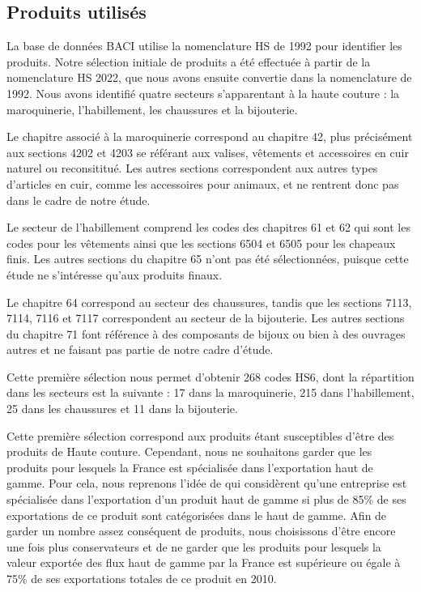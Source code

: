 \documentclass[french,10pt,a4paper]{article}
\begin{document}
\subsection{Produits utilisés}

La base de données BACI utilise la nomenclature HS de 1992 pour identifier les produits. Notre sélection initiale de produits a été effectuée à partir de la nomenclature HS 2022, que nous avons ensuite convertie dans la nomenclature de 1992. Nous avons identifié quatre secteurs s'apparentant à la haute couture : la maroquinerie, l'habillement, les chaussures et la bijouterie.

Le chapitre associé à la maroquinerie correspond au chapitre 42, plus précisément aux sections 4202 et 4203 se référant aux valises, vêtements et accessoires en cuir naturel ou reconsititué. Les autres sections correspondent aux autres types d'articles en cuir, comme les accessoires pour animaux, et ne rentrent donc pas dans le cadre de notre étude.

Le secteur de l'habillement comprend les codes des chapitres 61 et 62 qui sont les codes pour les vêtements ainsi que les sections 6504 et 6505 pour les chapeaux finis. Les autres sections du chapitre 65 n'ont pas été sélectionnées, puisque cette étude ne s'intéresse qu'aux produits finaux. 

Le chapitre 64 correspond au secteur des chaussures, tandis que les sections 7113, 7114, 7116 et 7117 correspondent au secteur de la bijouterie. Les autres sections du chapitre 71 font référence à des composants de bijoux ou bien à des ouvrages autres et ne faisant pas partie de notre cadre d'étude.

Cette première sélection nous permet d'obtenir 268 codes HS6, dont la répartition dans les secteurs est la suivante : 17 dans la maroquinerie, 215 dans l'habillement, 25 dans les chaussures et 11 dans la bijouterie.

\medskip

Cette première sélection correspond aux produits étant susceptibles d'être des produits de Haute couture. Cependant, nous ne souhaitons garder que les produits pour lesquels la France est spécialisée dans l'exportation haut de gamme. Pour cela, nous reprenons l'idée de \cite{Martin2015} qui considèrent qu'une entreprise est spécialisée dans l'exportation d'un produit haut de gamme si plus de 85\% de ses exportations de ce produit sont catégorisées dans le haut de gamme. Afin de garder un nombre assez conséquent de produits, nous choisissons d'être encore une fois plus conservateurs et de ne garder que les produits pour lesquels la valeur exportée des flux haut de gamme par la France est supérieure ou égale à 75\% de ses exportations totales de ce produit en 2010.
\end{document}

